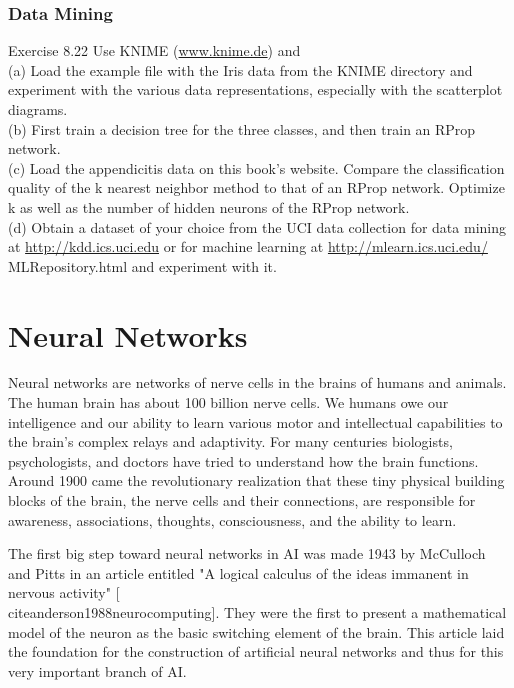\documentclass[10pt]{book}
\begin{document}
\subsection{Data Mining}
Exercise 8.22 Use KNIME (\href{http://www.knime.de}{www.knime.de}) and\\
(a) Load the example file with the Iris data from the KNIME directory and experiment with the various data representations, especially with the scatterplot diagrams.\\
(b) First train a decision tree for the three classes, and then train an RProp network.\\
(c) Load the appendicitis data on this book's website. Compare the classification quality of the k nearest neighbor method to that of an RProp network. Optimize k as well as the number of hidden neurons of the RProp network.\\
(d) Obtain a dataset of your choice from the UCI data collection for data mining at \href{http://kdd.ics.uci.edu}{http://kdd.ics.uci.edu} or for machine learning at \href{http://mlearn.ics.uci.edu/}{http://mlearn.ics.uci.edu/} MLRepository.html and experiment with it.


\chapter{Neural Networks}

Neural networks are networks of nerve cells in the brains of humans and animals. The human brain has about 100 billion nerve cells. We humans owe our intelligence and our ability to learn various motor and intellectual capabilities to the brain's complex relays and adaptivity. For many centuries biologists, psychologists, and doctors have tried to understand how the brain functions. Around 1900 came the revolutionary realization that these tiny physical building blocks of the brain, the nerve cells and their connections, are responsible for awareness, associations, thoughts, consciousness, and the ability to learn.

The first big step toward neural networks in AI was made 1943 by McCulloch and Pitts in an article entitled "A logical calculus of the ideas immanent in nervous activity" [\\cite{anderson1988neurocomputing}]. They were the first to present a mathematical model of the neuron as the basic switching element of the brain. This article laid the foundation for the construction of artificial neural networks and thus for this very important branch of AI.
\end{document}
